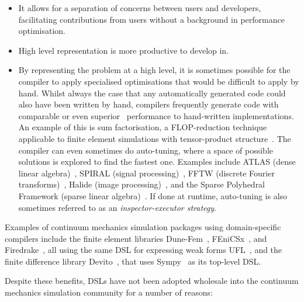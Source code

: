 \documentclass[thesis]{subfiles}
\begin{document}
\begin{itemize}
  \item
    It allows for a separation of concerns between users and developers, facilitating contributions from users without a background in performance optimisation.
  \item
    High level representation is more productive to develop in.
  \item
    By representing the problem at a high level, it is sometimes possible for the compiler to apply specialised optimisations that would be difficult to apply by hand.
    Whilst always the case that any automatically generated code could also have been written by hand, compilers frequently generate code with comparable or even superior~\cite{ragan-kelleyHalideLanguageCompiler} performance to hand-written implementations.
    An example of this is sum factorisation, a FLOP-reduction technique applicable to finite element simulations with tensor-product structure~\cite{homolyaExposingExploitingStructure2017}.
    The compiler can even sometimes do auto-tuning, where a space of possible solutions is explored to find the fastest one.
    Examples include ATLAS (dense linear algebra)~\cite{whaleyAutomatedEmpiricalOptimizations2001}, SPIRAL (signal processing)~\cite{puschelSPIRALCodeGeneration2005}, FFTW (discrete Fourier transforms)~\cite{frigoDesignImplementationFFTW32005}, Halide (image processing)~\cite{ragan-kelleyHalideLanguageCompiler}, and the Sparse Polyhedral Framework (sparse linear algebra)~\cite{stroutSparsePolyhedralFramework2018}.
    If done at runtime, auto-tuning is also sometimes referred to as an \textit{inspector-executor strategy}.
\end{itemize}

Examples of continuum mechanics simulation packages using domain-specific compilers include the finite element libraries Dune-Fem~\cite{dednerGenericInterfaceParallel2010}, FEniCSx~\cite{barattaDOLFINxNextGeneration2023}, and Firedrake~\cite{FiredrakeUserManual}, all using the same DSL for expressing weak forms UFL~\cite{alnaesUnifiedFormLanguage2014a}, and the finite difference library Devito~\cite{devito-api,luporiniArchitecturePerformanceDevito2020}, that uses Sympy~\cite{10.7717/peerj-cs.103} as its top-level DSL.

Despite these benefits, DSLs have not been adopted wholesale into the continuum mechanics simulation community for a number of reasons:
\end{document}
